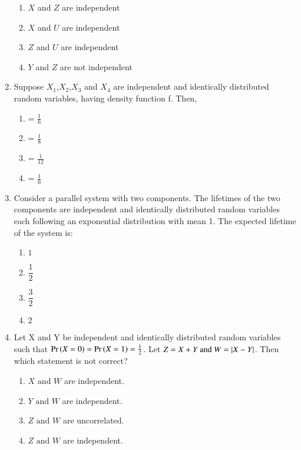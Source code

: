 \begin{enumerate}[label=\thesection.\arabic*.,ref=\thesection.\theenumi]
\begin{enumerate}
    \item $X$ and $Z$ are independent \label{dec2016-103:option 1}
    \item $X$ and $U$ are independent \label{dec2016-103:option 2}
    \item $Z$ and $U$ are independent \label{dec2016-103:option 3}
    \item $Y$ and $Z$ are not independent \label{dec2016-103:option 4}
\end{enumerate}
%
\solution

%
\item Suppose $X_1$,$X_2$,$X_3$ and $X_4$ are independent and identically distributed random variables, having density function f. Then,
\begin{enumerate}
\item {} = $\frac{1}{6}$
\item {} = $\frac{1}{8}$
\item {} = $\frac{1}{12}$
\item {} = $\frac{1}{6}$
\end{enumerate}
%
\solution

%
%
\item Consider a parallel system with two components. The lifetimes of the two components are independent and identically distributed random variables each following an exponential distribution with mean 1. The expected lifetime of the system is:
\begin{enumerate}[label=\Alph*)]
    \item $1$\\[0.5pt]
    \item $\dfrac{1}{2}$\\
    \item $\dfrac{3}{2}$\\
    \item $2$
\end{enumerate}
%
\solution

\item Let X and Y be independent and identically distributed random variables such that \(\Pr\left(X=0\right)=\Pr\left(X=1\right)= \frac{1}{2}\). Let \(Z = X+Y \text{ and } W = \left\vert X-Y\right\vert\). Then which statement is not correct?
 \begin{enumerate}
     \item $X \text{ and } W$ are independent.
     \item $Y \text{ and } W$ are independent.
     \item $Z \text{ and } W$ are uncorrelated.
     \item $Z \text{ and } W$ are independent.
 \end{enumerate}

\end{enumerate}